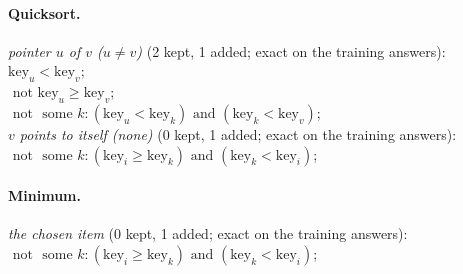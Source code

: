 \documentclass[10pt]{article}
\begin{document}
{\paragraph{Quicksort.}
\emph{pointer $u$ of $v$ ($u \neq v$)} (2 kept, 1 added; exact on the training answers):\\
\quad $\mathrm{key}_{u} < \mathrm{key}_{v}$;\\
\quad $\text{ not } \mathrm{key}_{u}  \geq  \mathrm{key}_{v}$;\\
\quad $\text{ not } \text{ some } k: (\mathrm{key}_{u} < \mathrm{key}_{k}) \text{ and } (\mathrm{key}_{k} < \mathrm{key}_{v})$;\\
\emph{$v$ points to itself (none)} (0 kept, 1 added; exact on the training answers):\\
\quad $\text{ not } \text{ some } k: (\mathrm{key}_{i}  \geq  \mathrm{key}_{k}) \text{ and } (\mathrm{key}_{k} < \mathrm{key}_{i})$;

\paragraph{Minimum.}
\emph{the chosen item} (0 kept, 1 added; exact on the training answers):\\
\quad $\text{ not } \text{ some } k: (\mathrm{key}_{i}  \geq  \mathrm{key}_{k}) \text{ and } (\mathrm{key}_{k} < \mathrm{key}_{i})$;

}
\end{document}
